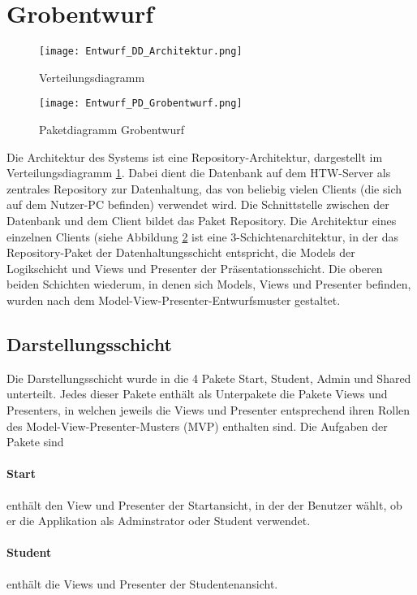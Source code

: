 \graphicspath{ {Entwurf/exports/png/} }


\section{Grobentwurf}
\begin{figure}
 \texttt{[image: Entwurf\_DD\_Architektur.png]}
 \label{fig:Deployment}
 \caption{Verteilungsdiagramm}
\end{figure}
\begin{figure}
 \texttt{[image: Entwurf\_PD\_Grobentwurf.png]}
 \label{fig:Paketdiagramm_Grobentwurf}
 \caption{Paketdiagramm Grobentwurf}
\end{figure}

Die Architektur des Systems ist eine Repository-Architektur, dargestellt im Verteilungsdiagramm \ref{fig:Deployment}. Dabei dient die Datenbank auf dem HTW-Server als zentrales Repository zur Datenhaltung, das von beliebig vielen Clients (die sich auf dem Nutzer-PC befinden) verwendet wird. Die Schnittstelle zwischen der Datenbank und dem Client bildet das Paket Repository.
Die Architektur eines einzelnen Clients (siehe Abbildung \ref{fig:Paketdiagramm_Grobentwurf} ist eine 3-Schichtenarchitektur, in der das Repository-Paket der Datenhaltungsschicht entspricht, die Models der Logikschicht und Views und Presenter der Präsentationsschicht. Die oberen beiden Schichten wiederum, in denen sich Models, Views und Presenter befinden, wurden nach dem Model-View-Presenter-Entwurfsmuster gestaltet.

\subsection{Darstellungsschicht}
Die Darstellungsschicht wurde in die 4 Pakete Start, Student, Admin und Shared unterteilt. Jedes dieser Pakete enthält als Unterpakete die Pakete Views und Presenters, in welchen jeweils die Views und Presenter entsprechend ihren Rollen des Model-View-Presenter-Musters (MVP) enthalten sind. Die Aufgaben der Pakete sind

\paragraph{Start} enthält den View und Presenter der Startansicht, in der der Benutzer wählt, ob er die Applikation als Adminstrator oder Student verwendet.
\paragraph{Student} enthält die Views und Presenter der Studentenansicht.
